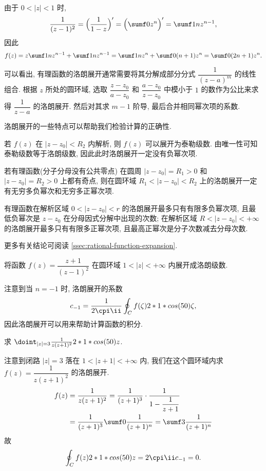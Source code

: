 \begin{solution}[解法二]
  由于 $0<|z|<1$ 时,
  \[
     \frac{1}{(z-1)^2}
    =\Bigl(\frac1{1-z}\Bigr)'
    =\Bigl(\sumf0 z^n\Bigr)'
    =\sumf1 nz^{n-1},
  \]
  因此
  \[
     f(z)
    =z\sumf1 nz^{n-1}+\sumf1 nz^{n-1}
    =\sumf1 nz^n+\sumf0 (n+1)z^n
    =\sumf0 (2n+1)z^n.
  \]
\end{solution}

可以看出, 有理函数的洛朗展开通常需要将其分解成部分分式 $\dfrac1{(z-a)^m}$ 的线性组合.
根据 $z$ 所处的圆环域, 选取 $\dfrac{z-z_0}{a-z_0}$ 和 $\dfrac{a-z_0}{z-z_0}$ 中模小于 $1$ 的数作为公比来求得 $\dfrac1{z-a}$ 的洛朗展开.
然后对其求 $m-1$ 阶导, 最后合并相同幂次项的系数.

洛朗展开的一些特点可以帮助我们检验计算的正确性.
\begin{enuma}
  \item 若 $f(z)$ 在 $|z-z_0|<R_2$ 内解析, 则 $f(z)$ 可以展开为泰勒级数. 由唯一性可知泰勒级数等于洛朗级数, 因此此时洛朗展开一定没有负幂次项.
  \item 若有理函数(分子分母没有公共零点) 在圆周 $|z-z_0|=R_1>0$ 和 $|z-z_0|=R_2>0$ 上都有奇点, 则在圆环域 $R_1<|z-z_0|<R_2$ 上的洛朗展开一定有无穷多负幂次和无穷多正幂次项.
  \item 有理函数在解析区域 $0<|z-z_0|<r$ 的洛朗展开最多只有有限多负幂次项, 且最低负幂次是 $z-z_0$ 在分母因式分解中出现的次数; 在解析区域 $R<|z-z_0|<+\infty$ 的洛朗展开最多只有有限多正幂次项, 且最高正幂次是分子次数减去分母次数.
\end{enuma}

更多有关结论可阅读 \ref{ssec:rational-function-expansion}.

\begin{exercise}
  将函数 $f(z)=\dfrac{z+1}{(z-1)^2}$ 在圆环域 $1<|z|<+\infty$ 内展开成洛朗级数.
\end{exercise}

注意到当 $n=-1$ 时, 洛朗展开的系数
\[
  c_{-1}=\frac1{2\cpi\ii}\oint_C f(\zeta)\d\zeta,
\]
因此洛朗展开可以用来帮助计算函数的积分.

\begin{example}
  求 $\doint_{|z|=3}\frac1{z(z+1)^2}\d z$.
\end{example}

\begin{solution}
  注意到闭路 $|z|=3$ 落在 $1<|z+1|<+\infty$ 内, 我们在这个圆环域内求 $f(z)=\dfrac1{z(z+1)^2}$ 的洛朗展开.
  \begin{align*}
     f(z)&
    =\frac1{z(z+1)^2}=\frac1{(z+1)^3}\cdot\frac1{1-\dfrac1{z+1}}\\&
    =\frac1{(z+1)^3}\sumf0 \frac1{(z+1)^n}
    =\sumf3 \frac1{(z+1)^n}
  \end{align*}
  故
  \[
    \oint_C f(z)\d z=2\cpi\ii  c_{-1}=0.
  \]
\end{solution}

